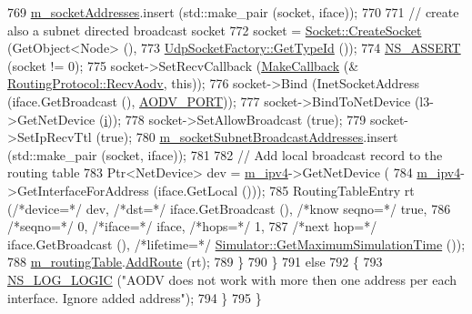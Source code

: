 \begin{DoxyCode}
769           \hyperlink{classns3_1_1aodv_1_1RoutingProtocol_aa3263563cbbd735faafbf17fd4e28a10}{m\_socketAddresses}.insert (std::make\_pair (socket, iface));
770 
771           \textcolor{comment}{// create also a subnet directed broadcast socket}
772           socket = \hyperlink{classns3_1_1Socket_ad448a62bb50ad3dbac59c879a885a8d2}{Socket::CreateSocket} (GetObject<Node> (),
773                                                        
      \hyperlink{classns3_1_1UdpSocketFactory_ad5b47e944de8861e3dc2b6de1ccbdf5b}{UdpSocketFactory::GetTypeId} ());
774           \hyperlink{assert_8h_a6dccdb0de9b252f60088ce281c49d052}{NS\_ASSERT} (socket != 0);
775           socket->SetRecvCallback (\hyperlink{group__makecallbackmemptr_ga9376283685aa99d204048d6a4b7610a4}{MakeCallback} (&
      \hyperlink{classns3_1_1aodv_1_1RoutingProtocol_a08c44000f66533e69bde85d68d75c354}{RoutingProtocol::RecvAodv}, \textcolor{keyword}{this}));
776           socket->Bind (InetSocketAddress (iface.GetBroadcast (), \hyperlink{classns3_1_1aodv_1_1RoutingProtocol_ac4a3de99b49ad5f6efc9b71a700f7ec4}{AODV\_PORT}));
777           socket->BindToNetDevice (l3->GetNetDevice (\hyperlink{bernuolliDistribution_8m_a6f6ccfcf58b31cb6412107d9d5281426}{i}));
778           socket->SetAllowBroadcast (\textcolor{keyword}{true});
779           socket->SetIpRecvTtl (\textcolor{keyword}{true});
780           \hyperlink{classns3_1_1aodv_1_1RoutingProtocol_a3516a9ee6cc1a0ebde0fdc08680dc7c4}{m\_socketSubnetBroadcastAddresses}.insert (std::make\_pair (socket, 
      iface));
781 
782           \textcolor{comment}{// Add local broadcast record to the routing table}
783           Ptr<NetDevice> dev = \hyperlink{classns3_1_1aodv_1_1RoutingProtocol_aee33006b1f9d8b24d4722037ff3fec98}{m\_ipv4}->GetNetDevice (
784               \hyperlink{classns3_1_1aodv_1_1RoutingProtocol_aee33006b1f9d8b24d4722037ff3fec98}{m\_ipv4}->GetInterfaceForAddress (iface.GetLocal ()));
785           RoutingTableEntry rt (\textcolor{comment}{/*device=*/} dev, \textcolor{comment}{/*dst=*/} iface.GetBroadcast (), \textcolor{comment}{/*know seqno=*/} \textcolor{keyword}{true},
786                                             \textcolor{comment}{/*seqno=*/} 0, \textcolor{comment}{/*iface=*/} iface, \textcolor{comment}{/*hops=*/} 1,
787                                             \textcolor{comment}{/*next hop=*/} iface.GetBroadcast (), \textcolor{comment}{/*lifetime=*/} 
      \hyperlink{classns3_1_1Simulator_aa8dbab888dca7bf3528421d2c5e67f99}{Simulator::GetMaximumSimulationTime} ());
788           \hyperlink{classns3_1_1aodv_1_1RoutingProtocol_a4e1003a34c8adc96db71096d88c98ae0}{m\_routingTable}.\hyperlink{classns3_1_1aodv_1_1RoutingTable_a579e562e38e67d510de1ff2c87806c76}{AddRoute} (rt);
789         \}
790     \}
791   \textcolor{keywordflow}{else}
792     \{
793       \hyperlink{group__logging_ga88acd260151caf2db9c0fc84997f45ce}{NS\_LOG\_LOGIC} (\textcolor{stringliteral}{"AODV does not work with more then one address per each interface. Ignore
       added address"});
794     \}
795 \}
\end{DoxyCode}


